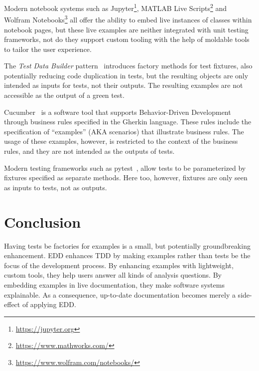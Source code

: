 \documentclass[sigplan,anonymous,review,10pt]{acmart}
\begin{document}
Modern notebook systems such as Jupyter\footnote{\url{https://jupyter.org}}, MATLAB Live Scripts\footnote{\url{https://www.mathworks.com/}} and Wolfram Notebooks\footnote{\url{https://www.wolfram.com/notebooks/}} all offer the ability to embed live instances of classes within notebook pages, but these live examples are neither integrated with unit testing frameworks, not do they support custom tooling with the help of moldable tools to tailor the user experience.


The \emph{Test Data Builder} pattern~\cite{Free09a} introduces factory methods for test fixtures, also potentially reducing code duplication in tests, but the resulting objects are only intended as inputs for tests, not their outputs.
The resulting examples are not accessible as the output of a green test.

Cucumber~\cite{Hell17a} is a software tool that supports Behavior-Driven Development through business rules specified in the Gherkin language.
These rules include the specification of ``examples'' (AKA scenarios) that illustrate business rules.
The usage of these examples, however, is restricted to the context of the business rules, and they are not intended as the outputs of tests.

Modern testing frameworks such as pytest~\cite{Okke22a}, allow tests to be parameterized by fixtures specified as separate methods.
Here too, however, fixtures are only seen as inputs to tests, not as outputs.

\section{Conclusion}\label{sec:conclusion}

Having tests be factories for examples is a small, but potentially groundbreaking enhancement.
EDD enhances TDD by making examples rather than tests be the focus of the development process.
By enhancing examples with lightweight, custom tools, they help users answer all kinds of analysis questions.
By embedding examples in live documentation, they make software systems explainable.
As a consequence, up-to-date documentation becomes merely a side-effect of applying EDD.





\end{document}
